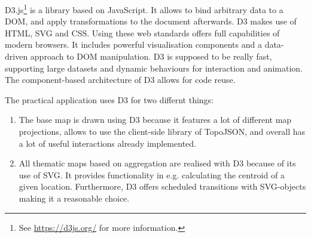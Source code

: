 D3.js\footnote{See \href{https://d3js.org/}{https://d3js.org/} for more information.} is a library based on JavaScript. It allows to bind arbitrary data to a \ac{DOM}, and apply transformations to the document afterwards. \ac{D3} makes use of \ac{HTML}, \ac{SVG} and \ac{CSS}. Using these web standards offers full capabilities of modern browsers. It includes powerful visualisation components and a data-driven approach to \ac{DOM} manipulation. \ac{D3} is supposed to be really fast, supporting large datasets and dynamic behaviours for interaction and animation. The component-based architecture of \ac{D3} allows for code reuse.

The practical application uses \ac{D3} for two differnt things:
\begin{enumerate}
\item The base map is drawn using \ac{D3} because it features a lot of different map projections, allows to use the client-side library of TopoJSON, and overall has a lot of useful interactions already implemented.
\item All thematic maps based on aggregation are realised with \ac{D3} because of its use of \ac{SVG}. It provides functionality in e.g. calculating the centroid of a given location. Furthermore, \ac{D3} offers scheduled transitions with \ac{SVG}-objects making it a reasonable choice.
\end{enumerate}
